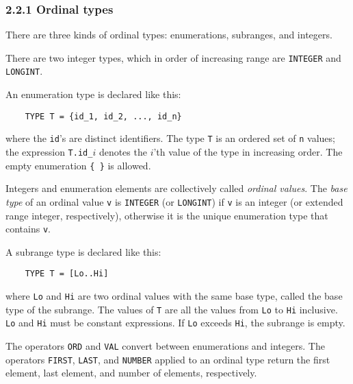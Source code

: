 \documentclass[10pt]{article}
\begin{document}
\subsubsection*{2.2.1 Ordinal types}

There are three kinds of ordinal types: enumerations, subranges, and integers.

There are two integer types, which in order of increasing range 
are \verb|INTEGER| and \verb|LONGINT|.

An enumeration type is declared like this:
\begin{verbatim}
    TYPE T = {id_1, id_2, ..., id_n}
\end{verbatim}
where the \verb|id|'s are distinct identifiers.  The type \verb|T| is an
ordered set of \verb|n| values; the expression \verb|T.id_|$i$ denotes the
$i$'th value of the type in increasing order.  The empty enumeration
\verb|{ }| is allowed.

Integers and enumeration elements are collectively called \emph{ordinal
  values}.  The \emph{base type} of an ordinal value \verb|v| is
\verb|INTEGER| (or \verb|LONGINT|) if \verb|v| is an integer (or extended
range integer, respectively), otherwise it is the unique enumeration type
that contains \verb|v|.

A subrange type is declared like this:
\begin{verbatim}
    TYPE T = [Lo..Hi]
\end{verbatim}
where \verb|Lo| and \verb|Hi| are two ordinal values with the same base type,
called the base type of the subrange.  The values of \verb|T| are all the
values from \verb|Lo| to \verb|Hi| inclusive.  \verb|Lo| and \verb|Hi| must be
constant expressions.  If \verb|Lo| exceeds \verb|Hi|, the subrange is empty.

The operators \verb|ORD| and \verb|VAL| convert between enumerations and
integers.  The operators \verb|FIRST|, \verb|LAST|, and \verb|NUMBER| applied
to an ordinal type return the first element, last element, and number of
elements, respectively.
\end{document}
